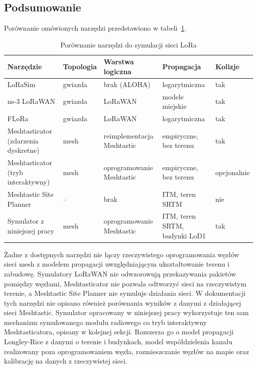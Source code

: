 \documentclass[12pt,a4paper,twoside]{report}
\theoremstyle{definition} %
\begin{document}
\subsection{Podsumowanie}

Porównanie omówionych narzędzi przedstawiono w tabeli~\ref{tab:symulatory}.

\begin{table}[ht]
\centering
\caption{Porównanie narzędzi do symulacji sieci LoRa}
\label{tab:symulatory}
\footnotesize
\begin{tabular}{|>{\raggedright\arraybackslash}p{2.6cm}|>{\raggedright\arraybackslash}p{1.7cm}|>{\raggedright\arraybackslash}p{2.6cm}|>{\raggedright\arraybackslash}p{2.6cm}|>{\raggedright\arraybackslash}p{1.9cm}|}
\hline
\textbf{Narzędzie} & \textbf{Topologia} & \textbf{Warstwa logiczna} & \textbf{Propagacja} & \textbf{Kolizje} \\
\hline
LoRaSim & gwiazda & brak (ALOHA) & logarytmiczna & tak \\ \hline
ns-3 LoRaWAN & gwiazda & LoRaWAN & modele miejskie & tak \\ \hline
FLoRa & gwiazda & LoRaWAN & logarytmiczna & tak \\ \hline
Meshtasticator (zdarzenia dyskretne) & mesh & reimplementacja Meshtastic & empiryczne, bez terenu & tak \\ \hline
Meshtasticator (tryb interaktywny) & mesh & oprogramowanie Meshtastic & empiryczne, bez terenu & opcjonalnie \\ \hline
Meshtastic Site Planner & -- & brak & ITM, teren SRTM & nie \\ \hline
Symulator z niniejszej pracy & mesh & oprogramowanie Meshtastic & ITM, teren SRTM, budynki LoD1 & tak \\ \hline
\end{tabular}
\end{table}

Żadne z dostępnych narzędzi nie łączy rzeczywistego oprogramowania węzłów sieci mesh z modelem propagacji uwzględniającym ukształtowanie terenu i zabudowę. Symulatory LoRaWAN nie odwzorowują przekazywania pakietów pomiędzy węzłami, Meshtasticator nie pozwala odtworzyć sieci na rzeczywistym terenie, a Meshtastic Site Planner nie symuluje działania sieci. W dokumentacji tych narzędzi nie opisano również porównania wyników z danymi z działającej sieci Meshtastic. Symulator opracowany w niniejszej pracy wykorzystuje ten sam mechanizm symulowanego modułu radiowego co tryb interaktywny Meshtasticatora, opisany w kolejnej sekcji. Rozszerza go o model propagacji Longley-Rice z danymi o terenie i budynkach, model współdzielenia kanału realizowany poza oprogramowaniem węzła, rozmieszczanie węzłów na mapie oraz kalibrację na danych z rzeczywistej sieci.
\end{document}

